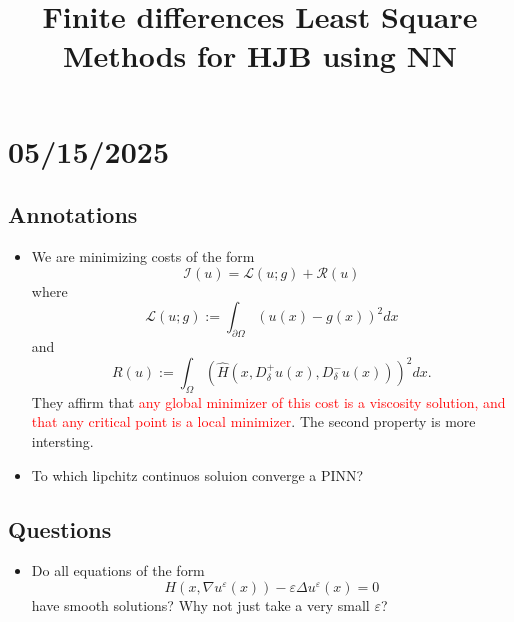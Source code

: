 \documentclass[12pt]{article}
\date{}
\begin{document}
	\title{Finite differences Least Square Methods for HJB using NN} %
	\maketitle
	\section*{05/15/2025}

	\subsection*{Annotations}
	\begin{itemize}
		\item We are minimizing costs of the form $${\mathcal{I}}(u)={\mathcal{L}}(u;g)+{\mathcal{R}}(u)$$ where $$\mathcal{L}(u;g):=\int_{\partial\Omega}\left(u(x)-g(x)\right)^{2}d x$$ and $$R(u):=\int_{\Omega}\left({\widehat{H}}(x,D_{\delta}^{+}u(x),D_{\delta}^{-}u(x))\right)^{2}d x.$$
		They affirm that \textcolor{red}{any global minimizer of this cost is a viscosity solution, and that any critical point is a local minimizer}. The second property is more intersting.
		\item To which lipchitz continuos soluion converge a PINN?
	\end{itemize}
	\subsection{Questions}
	\begin{itemize}
		\item Do all equations of the form $$H(x,\nabla u^{\varepsilon}(x))-\varepsilon\Delta u^{\varepsilon}(x)=0$$ have smooth solutions? Why not just take a very small $\varepsilon$?
	\end{itemize}
\end{document}
